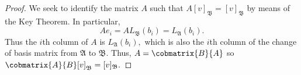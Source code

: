 \begin{proof}
    We seek to identify the matrix $A$ such that $A[v]_\mathfrak{B} = [v]_\mathfrak{B}$ by means of the Key Theorem. In particular, $$Ae_i = AL_\mathfrak{B}(b_i) = L_\mathfrak{A}(b_i).$$ Thus the $i$th column of $A$ is $L_\mathfrak{A}(b_i),$ which is also the $i$th column of the change of basis matrix from $\mathfrak{A}$ to $\mathfrak{B}.$ Thus, $A=\cobmatrix{B}{A}$ so $\cobmatrix{A}{B}[v]_\mathfrak{B} = [v]_\mathfrak{B}.$
\end{proof}